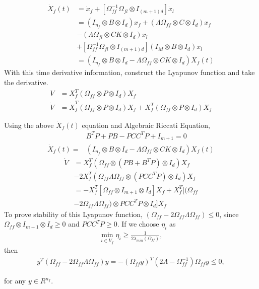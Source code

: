  \begin{align*} 
   \dot X_f(t) &= \dot x_f + [\Omega_{ff}^{-1} \Omega_{fl} \otimes I_{(m+1)d}] \dot x_l\\
   &= (I_{n_f}\otimes B \otimes I_d)x_f + (\Lambda \Omega_{ff}\otimes C \otimes I_d)x_f\\
   &- (\Lambda \Omega_{fl} \otimes CK \otimes I_d) x_l\\ &+[\Omega_{ff}^{-1} \Omega_{fl} \otimes I_{(m+1)d}] (I_M\otimes B \otimes I_d)x_l\\
   &= (I_{n_f}\otimes B \otimes I_d - \Lambda \Omega_{ff} \otimes CK \otimes I_d)X_f(t)
 \end{align*}
 With this time derivative information, construct the Lyapunov function and take the derivative.
 \begin{align*}
   V &= X_f^T (\Omega_{ff} \otimes P \otimes I_d) X_f\\
   \dot V &= \dot X_f^T (\Omega_{ff} \otimes P \otimes I_d) X_f + X_f^T (\Omega_{ff} \otimes P \otimes I_d) \dot X_f
 \end{align*}


 Using the above $\dot X_f(t)$ equation and Algebraic Riccati Equation, 
 \begin{align*}
   &B^T P + P B - PCC^TP + I_{m+1} =0\\
   \dot X_f(t) =& (I_{n_f}\otimes B \otimes I_d - \Lambda \Omega_{ff} \otimes CK \otimes I_d)X_f(t)
 \end{align*}
 \begin{align*}
   \dot V &= X_f^T (\Omega_{ff} \otimes (PB + B^TP) \otimes I_d) X_f \\
   &-2 X_f^T (\Omega_{ff}\Lambda\Omega_{ff} \otimes (PCC^TP) \otimes I_d) X_f\\
   &= - X_f^T [\Omega_{ff}\otimes I_{m+1} \otimes I_d] X_f + X_f^T [(\Omega_{ff} \\
   &- 2\Omega_{ff}\Lambda\Omega_{ff})\otimes PCC^TP \otimes I_d]X_f
 \end{align*}
 To prove stability of this Lyapunov function, $(\Omega_{ff} - 2\Omega_{ff}\Lambda\Omega_{ff}) \leq 0$, since $\Omega_{ff}\otimes I_{m+1} \otimes I_d \geq 0$ and $PCC^TP \geq 0$. If we choose $\eta_i$ as
 \begin{align*}
   \min_{i\in V_f} \eta_i \geq \frac{1}{2\lambda_{min}(\Omega_{ff})},
 \end{align*} then 
 \begin{align*}
   y^T(\Omega_{ff}- 2\Omega_{ff}\Lambda\Omega_{ff})y = -(\Omega_{ff}y)^T(2\Lambda - \Omega_{ff}^{-1})\Omega_{ff}y \leq 0,
 \end{align*}
 
 for any $y \in R^{n_f}$.